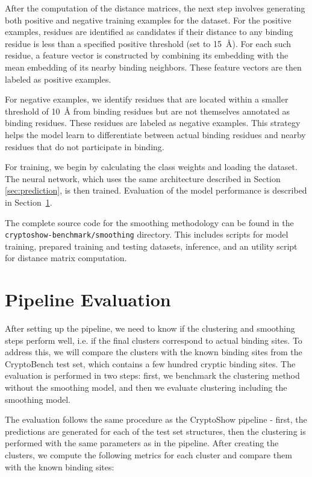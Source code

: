 After the computation of the distance matrices, the next step involves generating both positive and negative training examples for the dataset. For the positive examples, residues are identified as candidates if their distance to any binding residue is less than a specified positive threshold (set to 15~\AA). For each such residue, a feature vector is constructed by combining its embedding with the mean embedding of its nearby binding neighbors. These feature vectors are then labeled as positive examples.

For negative examples, we identify residues that are located within a smaller threshold of 10~\AA{} from binding residues but are not themselves annotated as binding residues. These residues are labeled as negative examples. This strategy helps the model learn to differentiate between actual binding residues and nearby residues that do not participate in binding.

For training, we begin by calculating the class weights and loading the dataset. The neural network, which uses the same architecture described in Section \ref{sec:prediction}, is then trained. Evaluation of the model performance is described in Section~\ref{sec:pipeline-evaluation}.

The complete source code for the smoothing methodology can be found in the \lstinline!cryptoshow-benchmark/smoothing! directory. This includes scripts for model training, prepared training and testing datasets, inference, and an utility script for distance matrix computation.

\section{Pipeline Evaluation}
\label{sec:pipeline-evaluation}

After setting up the pipeline, we need to know if the clustering and smoothing steps perform well, i.e. if the final clusters correspond to actual binding sites. To address this, we will compare the clusters with the known binding sites from the CryptoBench test set, which contains a few hundred cryptic binding sites.  The evaluation is performed in two steps: first, we benchmark the clustering method without the smoothing model, and then we evaluate clustering including the smoothing model.

The evaluation follows the same procedure as the CryptoShow pipeline - first, the predictions are generated for each of the test set structures, then the clustering is performed with the same parameters as in the pipeline. After creating the clusters, we compute the following metrics for each cluster and compare them with the known binding sites:

